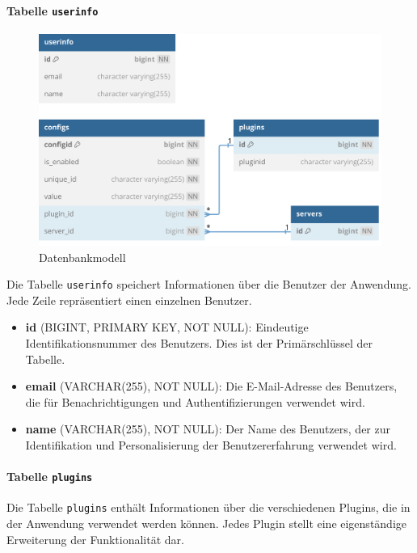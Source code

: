 \paragraph{\texorpdfstring{Tabelle \texttt{userinfo}}{Tabelle userinfo}}\label{tabelle-userinfo}
\begin{figure}[!htbp]
  \centering
  \includegraphics[width=\textwidth]{images/20240529-dbschema.png}
  \caption{Datenbankmodell}\label{fig:database-schema}
\end{figure}
  
Die Tabelle \texttt{userinfo} speichert Informationen über die Benutzer der Anwendung. Jede Zeile repräsentiert einen einzelnen Benutzer.

\begin{itemize}
\item
  \textbf{id} (BIGINT, PRIMARY KEY, NOT NULL): Eindeutige Identifikationsnummer des Benutzers. Dies ist der Primärschlüssel der Tabelle.
\item
  \textbf{email} (VARCHAR(255), NOT NULL): Die E-Mail-Adresse des Benutzers, die für Benachrichtigungen und Authentifizierungen verwendet wird.
\item
  \textbf{name} (VARCHAR(255), NOT NULL): Der Name des Benutzers, der zur Identifikation und Personalisierung der Benutzererfahrung verwendet wird.
\end{itemize}

\paragraph{\texorpdfstring{Tabelle \texttt{plugins}}{Tabelle plugins}}\label{tabelle-plugins}

Die Tabelle \texttt{plugins} enthält Informationen über die verschiedenen Plugins, die in der Anwendung verwendet werden können. Jedes Plugin stellt eine eigenständige Erweiterung der Funktionalität dar.


